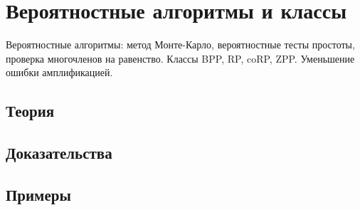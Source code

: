 
\section{Вероятностные алгоритмы и классы}
\label{sec:2.3a.14-probabilistic-classes}

\begin{ticket}
Вероятностные алгоритмы: метод Монте-Карло, вероятностные тесты простоты, проверка многочленов на равенство. Классы BPP, RP, coRP, ZPP. Уменьшение ошибки амплификацией.
\end{ticket}

\subsection*{Теория}

\subsection*{Доказательства}

\subsection*{Примеры}

